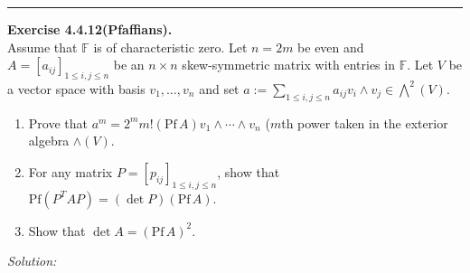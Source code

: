 \documentclass[a4paper, 12pt]{article}
\newenvironment{problem}[2][Exercise]
    { \begin{mdframed}[backgroundcolor=gray!20] \textbf{#1 #2} \\}
    {  \end{mdframed}}
\newenvironment{solution}
    {\textit{Solution:}}
    {}
\begin{document}
\noindent\rule{7in}{2.8pt}
\begin{problem}{4.4.12(Pfaffians).}
Assume that \(\mathbb{F}\) is of characteristic zero. Let \(n=2m\) be even and \(A=[a_{ij}]_{1\leq i,j\leq n}\) be an \(n\times n\) skew-symmetric matrix with entries in \(\mathbb{F}\). Let \(V\) be a vector space with basis \(v_1,\ldots,v_n\) and 
set \(a:=\sum_{1\leq i,j\leq n} a_{ij}v_i\wedge v_j\in \bigwedge^2(V)\).
\begin{enumerate}[(1)]
\item Prove that \(a^m=2^m m!(\text{Pf}\, A)v_1\wedge \cdots\wedge v_n\) (\(m\)th power taken in the exterior algebra \(\wedge(V)\).
\item For any matrix \(P=[p_{ij}]_{1\leq i,j\leq n}\), show that \(\text{Pf}(P^T AP)=(\det P)(\text{Pf}\, A)\).
\item Show that \(\det A=(\text{Pf}\, A)^2\).
\end{enumerate}
\end{problem}
\begin{solution}
	
\end{solution}
\end{document}
